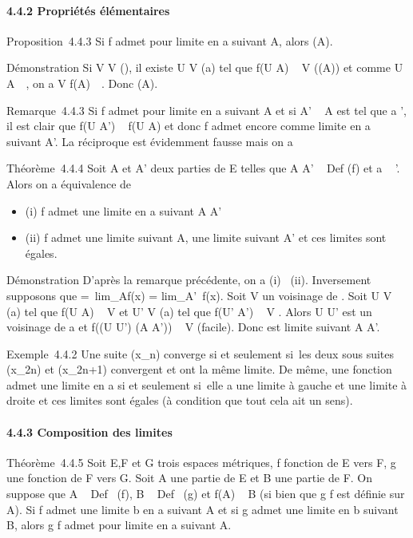 \documentclass[]{article}
\begin{document}
\paragraph{4.4.2 Propriétés élémentaires}

Proposition~4.4.3 Si f admet \ell pour limite en a suivant A, alors \ell
\in\overlinef(A).

Démonstration Si V \in V (\ell), il existe U \in V (a) tel que f(U \bigcap A) \subset~ V
(\bigcapf(A)) et comme U \bigcap A\neq~\varnothing~, on a V \bigcap
f(A)\neq~\varnothing~. Donc \ell
\in\overlinef(A).

Remarque~4.4.3 Si f admet \ell pour limite en a suivant A et si A' \subset~ A est
tel que a \in\overlineA', il est clair que f(U \bigcap A') \subset~
f(U \bigcap A) et donc f admet encore \ell comme limite en a suivant A'. La
réciproque est évidemment fausse mais on a

Théorème~4.4.4 Soit A et A' deux parties de E telles que A \cup A'
\subset~ Def (f) et a \in\overlineA~
\bigcap\overlineA'. Alors on a équivalence de

\begin{itemize}
\itemsep1pt\parskip0pt
\item
  (i) f admet une limite en a suivant A \cup A'
\item
  (ii) f admet une limite suivant A, une limite suivant A' et ces
  limites sont égales.
\end{itemize}

Démonstration D'après la remarque précédente, on a (i) \rigtharrow~(ii).
Inversement supposons que \ell =\
lim_Af(x) = lim_A'~f(x). Soit
V un voisinage de \ell. Soit U \in V (a) tel que f(U \bigcap A) \subset~ V et U' \in V (a)
tel que f(U' \bigcap A') \subset~ V . Alors U \bigcap U' est un voisinage de a et f((U \bigcap
U') \bigcap (A \cup A')) \subset~ V (facile). Donc \ell est limite suivant A \cup A'.

Exemple~4.4.2 Une suite (x_n) converge si et seulement si~les
deux sous suites (x_2n) et (x_2n+1) convergent et ont
la même limite. De même, une fonction admet une limite en a si et
seulement si~elle a une limite à gauche et une limite à droite et ces
limites sont égales (à condition que tout cela ait un sens).

\paragraph{4.4.3 Composition des limites}

Théorème~4.4.5 Soit E,F et G trois espaces métriques, f fonction de E
vers F, g une fonction de F vers G. Soit A une partie de E et B une
partie de F. On suppose que A \subset~ Def~ (f), B
\subset~ Def~ (g) et f(A) \subset~ B (si bien que g \cdot f est
définie sur A). Si f admet une limite b en a suivant A et si g admet une
limite \ell en b suivant B, alors g \cdot f admet \ell pour limite en a suivant A.
\end{document}
